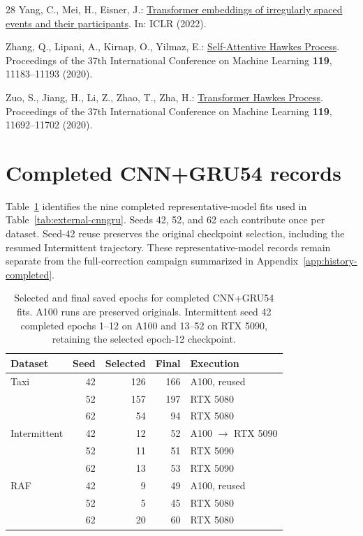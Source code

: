 \documentclass[runningheads]{llncs}
\begin{document}
\begin{thebibliography}{28}
Yang, C., Mei, H., Eisner, J.:
\href{https://www.cs.jhu.edu/~jason/papers/yang+al.iclr22.pdf}{Transformer embeddings of irregularly spaced events and their participants}. In: ICLR (2022).

Zhang, Q., Lipani, A., Kirnap, O., Yilmaz, E.: \href{https://proceedings.mlr.press/v119/zhang20q.html}{Self-Attentive Hawkes Process}. Proceedings of the 37th International Conference on Machine Learning \textbf{119}, 11183--11193 (2020).

Zuo, S., Jiang, H., Li, Z., Zhao, T., Zha, H.: \href{https://proceedings.mlr.press/v119/zuo20a.html}{Transformer Hawkes Process}. Proceedings of the 37th International Conference on Machine Learning \textbf{119}, 11692--11702 (2020).
\end{thebibliography}

\clearpage
\appendix
\renewcommand{\theHsection}{\Alph{section}}
\section{Completed CNN+GRU54 records}
\label{app:cnngru-records}
Table~\ref{tab:cnngru-epochs} identifies the nine completed representative-model fits used in Table~\ref{tab:external-cnngru}. Seeds 42, 52, and 62 each contribute once per dataset. Seed-42 reuse preserves the original checkpoint selection, including the resumed Intermittent trajectory. These representative-model records remain separate from the full-correction campaign summarized in Appendix~\ref{app:history-completed}.

\begin{table}[htbp]
\caption{Selected and final saved epochs for completed CNN+GRU54 fits. A100 runs are preserved originals. Intermittent seed 42 completed epochs 1--12 on A100 and 13--52 on RTX 5090, retaining the selected epoch-12 checkpoint.}
\label{tab:cnngru-epochs}
\centering\small
\begin{tabular}{@{}lrrrl@{}}
\toprule
Dataset & Seed & Selected & Final & Execution\\
\midrule
Taxi & 42 & 126 & 166 & A100, reused\\
 & 52 & 157 & 197 & RTX 5080\\
 & 62 & 54 & 94 & RTX 5080\\
\midrule
Intermittent & 42 & 12 & 52 & A100 $\to$ RTX 5090\\
 & 52 & 11 & 51 & RTX 5090\\
 & 62 & 13 & 53 & RTX 5090\\
\midrule
RAF & 42 & 9 & 49 & A100, reused\\
 & 52 & 5 & 45 & RTX 5080\\
 & 62 & 20 & 60 & RTX 5080\\
\bottomrule
\end{tabular}
\end{table}
\end{document}
